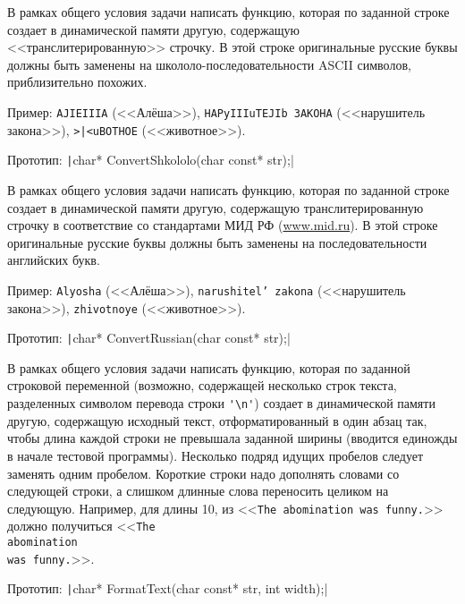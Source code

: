 \begin{zztask}
В рамках общего условия задачи написать функцию, которая по заданной строке
создает в динамической памяти другую, содержащую <<транслитерированную>>
строчку. В этой строке оригинальные русские буквы должны быть заменены на
школоло-последовательности ASCII символов, приблизительно похожих.

Пример:
\verb|AJIEIIIA| (<<Алёша>>), \verb|HAPyIIIuTEJIb 3AKOHA|
(<<нарушитель закона>>), \verb!>|<uBOTHOE! (<<животное>>).

Прототип: \texttt|char* ConvertShkololo(char const* str);|
\end{zztask}

\begin{zztask}
В рамках общего условия задачи написать функцию, которая по заданной строке
создает в динамической памяти другую, содержащую транслитерированную
строчку в соответствие со стандартами МИД РФ (\url{www.mid.ru}).
В этой строке оригинальные русские буквы должны быть заменены на
последовательности английских букв.

Пример:
\texttt{Alyosha} (<<Алёша>>), \texttt{narushitel{'} zakona}
(<<нарушитель закона>>), \texttt{zhivotnoye} (<<животное>>).

Прототип: \texttt|char* ConvertRussian(char const* str);|
\end{zztask}

\begin{zztask}
В рамках общего условия задачи написать функцию, которая по заданной строковой
переменной (возможно, содержащей несколько строк текста, разделенных символом
перевода строки \verb|'\n'|) создает в динамической памяти другую, содержащую
исходный текст, отформатированный в один абзац так, чтобы длина каждой
строки не превышала заданной ширины (вводится единожды в начале тестовой программы).
Несколько подряд идущих пробелов следует заменять одним пробелом.
Короткие строки надо дополнять словами со следующей строки, а слишком
длинные слова переносить целиком на следующую.
Например, для длины 10, из
<<\texttt{The abomination was                funny.}>>
должно получиться
<<\texttt{The \\abomination\\was funny.}>>.

Прототип: \texttt|char* FormatText(char const* str, int width);|
\end{zztask}

